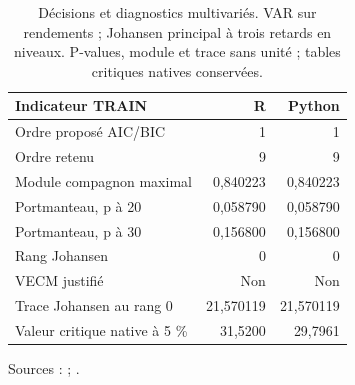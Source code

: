 \begin{table}[!htbp]
\centering
\caption{Décisions et diagnostics multivariés. VAR sur rendements ; Johansen principal à trois retards en niveaux. P-values, module et trace sans unité ; tables critiques natives conservées.}
\label{tab:var_johansen}
\small
\setlength{\tabcolsep}{4pt}
\renewcommand{\arraystretch}{1.16}
\begin{tabularx}{\linewidth}{Xrr}
\toprule
\textbf{Indicateur TRAIN} & \textbf{R} & \textbf{Python} \\
\midrule
Ordre proposé AIC/BIC & 1 & 1 \\
Ordre retenu & 9 & 9 \\
Module compagnon maximal & 0,840223 & 0,840223 \\
Portmanteau, p à 20 & 0,058790 & 0,058790 \\
Portmanteau, p à 30 & 0,156800 & 0,156800 \\
Rang Johansen & 0 & 0 \\
VECM justifié & Non & Non \\
Trace Johansen au rang 0 & 21,570119 & 21,570119 \\
Valeur critique native à 5 \% & 31,5200 & 29,7961 \\
\bottomrule
\end{tabularx}
\par\smallskip
\begin{minipage}{\linewidth}\footnotesize Sources :  ; .
\end{minipage}
\end{table}
